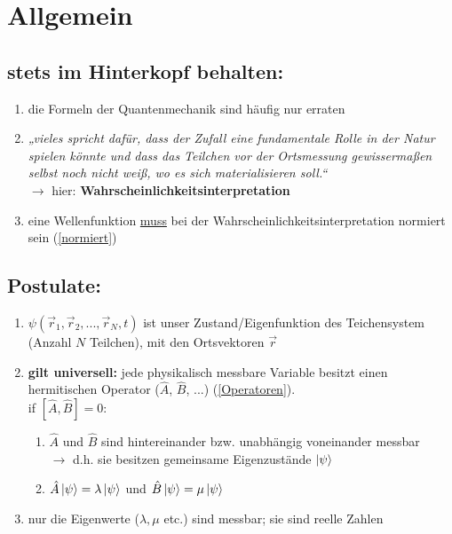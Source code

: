 \pagestyle{headings}

\section{Allgemein}

\subsection{stets im Hinterkopf behalten:}
\begin{enumerate}
\item die Formeln der Quantenmechanik sind häufig nur erraten
\item \textit{„vieles spricht dafür, dass der Zufall eine fundamentale Rolle in der Natur spielen könnte und dass 
das Teilchen vor der Ortsmessung gewissermaßen selbst noch nicht weiß, wo es sich materialisieren soll.“} \\
$\rightarrow$ hier: \textbf{Wahrscheinlichkeitsinterpretation}
\item eine Wellenfunktion \underline{muss} bei der Wahrscheinlichkeitsinterpretation normiert sein (\ref{normiert})
\end{enumerate}

\subsection{Postulate:}
\begin{enumerate}
\item $\psi(\vec{r}_1,\vec{r}_2, ...,\vec{r}_N,t)$ ist unser Zustand/Eigenfunktion des Teichensystem (Anzahl $N$ Teilchen), mit den Ortsvektoren $\vec{r}$
\item \textbf{gilt universell:} jede physikalisch messbare Variable besitzt einen hermitischen Operator ($\hat{A}$, $\hat{B}$, ...) (\ref{Operatoren}).\\
 if $[\hat{A},\hat{B}]=0$:
\begin{enumerate}
    \item $\hat{A}$ und $\hat{B}$ sind hintereinander bzw. unabhängig voneinander messbar \\
    $\rightarrow$ d.h. sie besitzen gemeinsame Eigenzustände $\ket{\psi}$
    \item $\hat{A}\ket{\psi}=\lambda\ket{\psi}$ und $\hat{B}\ket{\psi}=\mu\ket{\psi}$
\end{enumerate}
\item nur die Eigenwerte ($\lambda,\mu$ etc.) sind messbar; sie sind reelle Zahlen 

\end{enumerate}



